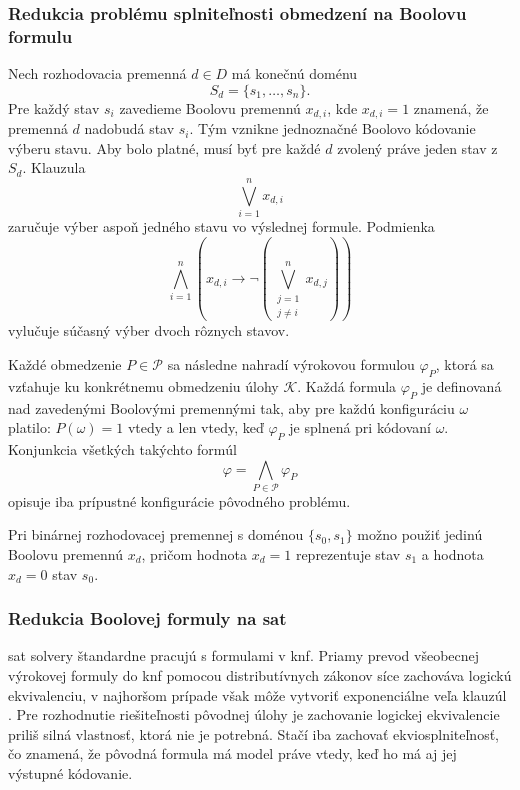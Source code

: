 \subsubsection{Redukcia problému splniteľnosti obmedzení na Boolovu formulu}\label{sec:combinatorics:reduction:boolean-formula}
Nech rozhodovacia premenná $d \in D$ má konečnú doménu
\[
    S_d = \{s_1,\dots,s_n\}.
\]
Pre každý stav $s_i$ zavedieme Boolovu premennú $x_{d,i}$, kde $x_{d,i}=1$ znamená, že premenná $d$ nadobudá stav $s_i$. Tým vznikne jednoznačné Boolovo kódovanie výberu stavu. Aby bolo platné, musí byť pre každé $d$ zvolený práve jeden stav z $S_d$.
Klauzula
\begin{equation}\label{eq:exactly-one}
    \bigvee_{i=1}^{n} x_{d,i}
\end{equation}
zaručuje výber aspoň jedného stavu vo výslednej formule. Podmienka
\begin{equation}\label{eq:at-most-one}
    \bigwedge_{i=1}^{n}
    \left(
    x_{d,i} \to
    \lnot
    \left(\bigvee_{\substack{j=1 \\ j \neq i}}^{n} x_{d,j}\right)
    \right)
\end{equation}
vylučuje súčasný výber dvoch rôznych stavov.

Každé obmedzenie $P \in \mathcal{P}$ sa následne nahradí výrokovou formulou $\varphi_P$, ktorá sa vzťahuje ku konkrétnemu obmedzeniu úlohy $\mathcal{K}$. Každá formula $\varphi_P$ je definovaná nad zavedenými Boolovými premennými tak, aby pre každú konfiguráciu $\omega$ platilo:
$P(\omega)=1$ vtedy a len vtedy, keď $\varphi_P$ je splnená pri kódovaní $\omega$.
Konjunkcia všetkých takýchto formúl
\[
    \varphi = \bigwedge_{P \in \mathcal{P}} \varphi_P
\]
opisuje iba prípustné konfigurácie pôvodného problému.

Pri binárnej rozhodovacej premennej s doménou $\{s_0,s_1\}$ možno použiť jedinú Boolovu premennú $x_d$, pričom hodnota $x_d=1$ reprezentuje stav $s_1$ a hodnota $x_d=0$ stav $s_0$.

\subsubsection{Redukcia Boolovej formuly na \acrshort{sat}}\label{sec:combinatorics:reduction:sat}
\Acrshort{sat} solvery štandardne pracujú s formulami v \acrshort{knf}. Priamy prevod všeobecnej výrokovej formuly do \acrshort{knf} pomocou distributívnych zákonov síce zachováva logickú ekvivalenciu, v najhoršom prípade však môže vytvoriť exponenciálne veľa klauzúl \cite{clause-norm-convention-for-boolena-circuts}. Pre rozhodnutie riešiteľnosti pôvodnej úlohy je zachovanie logickej ekvivalencie priliš silná vlastnosť, ktorá nie je potrebná. Stačí iba zachovať ekviosplniteľnosť, čo znamená, že pôvodná formula má model práve vtedy, keď ho má aj jej výstupné kódovanie.

